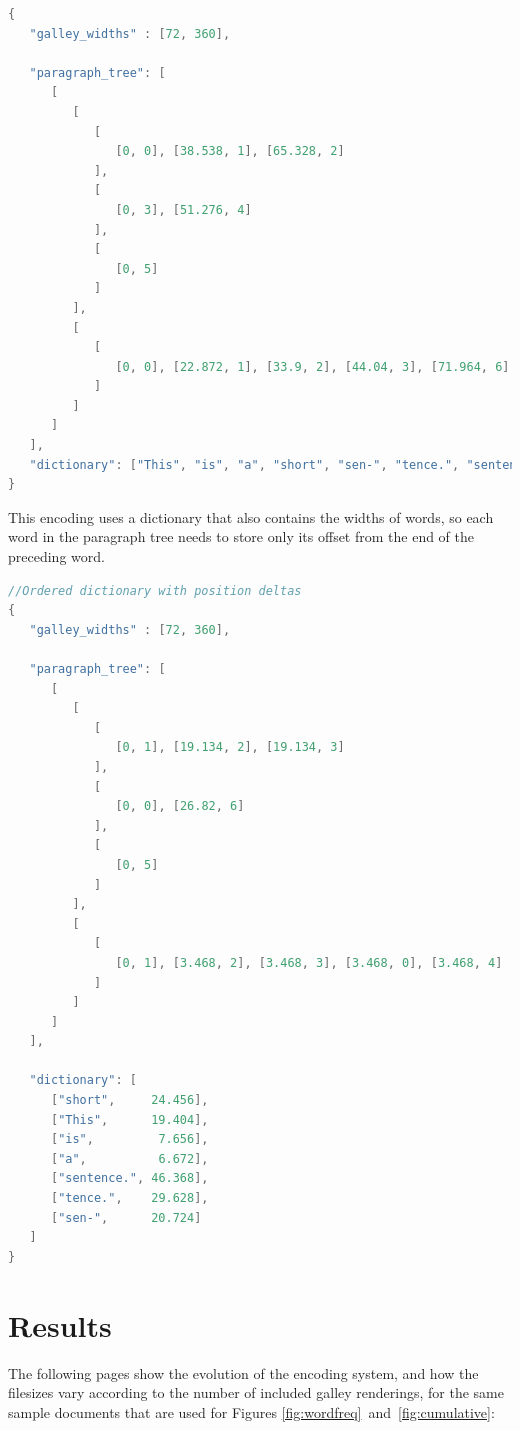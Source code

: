 \vspace{0.5in}
\begin{lstlisting}[language=c,stringstyle=\color{blue},basicstyle=\ttfamily\footnotesize]
{
   "galley_widths" : [72, 360],

   "paragraph_tree": [
      [
         [
            [
               [0, 0], [38.538, 1], [65.328, 2]
            ],
            [
               [0, 3], [51.276, 4]
            ],
            [
               [0, 5]
            ]
         ],
         [
            [
               [0, 0], [22.872, 1], [33.9, 2], [44.04, 3], [71.964, 6]
            ]
         ]
      ]
   ],
   "dictionary": ["This", "is", "a", "short", "sen-", "tence.", "sentence."]
}
\end{lstlisting}

\clearpage

This encoding uses a dictionary that also contains the widths of words, so each word in the paragraph tree needs to store only its offset from the end of the preceding word.

\vspace{0.5in}
\begin{lstlisting}[language=c,stringstyle=\color{blue},basicstyle=\ttfamily\footnotesize]
//Ordered dictionary with position deltas
{
   "galley_widths" : [72, 360],

   "paragraph_tree": [
      [
         [
            [
               [0, 1], [19.134, 2], [19.134, 3]
            ],
            [
               [0, 0], [26.82, 6]
            ],
            [
               [0, 5]
            ]
         ],
         [
            [
               [0, 1], [3.468, 2], [3.468, 3], [3.468, 0], [3.468, 4]
            ]
         ]
      ]
   ],

   "dictionary": [
      ["short",     24.456],
      ["This",      19.404],
      ["is",         7.656],
      ["a",          6.672],
      ["sentence.", 46.368],
      ["tence.",    29.628],
      ["sen-",      20.724]
   ]
}
\end{lstlisting}


\clearpage
\section{Results}

The following pages show the evolution of the encoding system, and how the filesizes vary according to the number of included galley renderings, for the same sample documents that are used for Figures \ref{fig:wordfreq}~and~\ref{fig:cumulative}:

